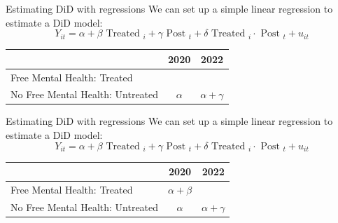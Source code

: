 \documentclass[11pt]{beamer}
\begin{document}
\begin{frame}{Estimating DiD with regressions}
We can set up a simple linear regression to estimate a  DiD model:
$$
Y_{i t}=\alpha+\beta \text { Treated }_i+\gamma \text { Post }_t+\delta \text { Treated }_i \cdot \text { Post }_t+u_{i t}
$$


\begin{table}[]
\begin{tabular}{lcc}
\toprule
\textbf{}                        & \textbf{2020} & \textbf{2022} \\ \midrule
Free Mental Health: Treated      &          &          \\ \midrule
No Free Mental Health: Untreated &    $\alpha$       & $\alpha + \gamma$        \\ \bottomrule
\end{tabular}
\end{table}


\end{frame}






\begin{frame}{Estimating DiD with regressions}
We can set up a simple linear regression to estimate a  DiD model:
$$
Y_{i t}=\alpha+\beta \text { Treated }_i+\gamma \text { Post }_t+\delta \text { Treated }_i \cdot \text { Post }_t+u_{i t}
$$


\begin{table}[]
\begin{tabular}{lcc}
\toprule
\textbf{}                        & \textbf{2020} & \textbf{2022} \\ \midrule
Free Mental Health: Treated      &    $\alpha + \beta$       &         \\ \midrule
No Free Mental Health: Untreated &    $\alpha$       & $\alpha + \gamma$        \\ \bottomrule
\end{tabular}
\end{table}


\end{frame}
\end{document}
